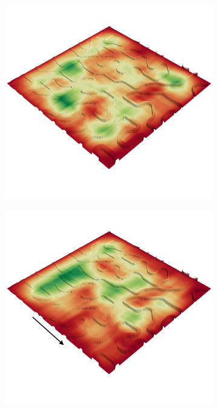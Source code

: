\documentclass[../document.tex]{subfiles}
\begin{document}
\begin{figure} [htbp]
\begin{subfigure}[b]{0.45\textwidth}
      \includegraphics[width=\linewidth]{../img/4/traversability/bars/-90.png}
  \end{subfigure}
  \begin{subfigure}[b]{0.45\textwidth}
    \includegraphics[width=\linewidth]{../img/4/traversability/bars/-0.png}

\end{subfigure}
\end{figure}
\end{document}
